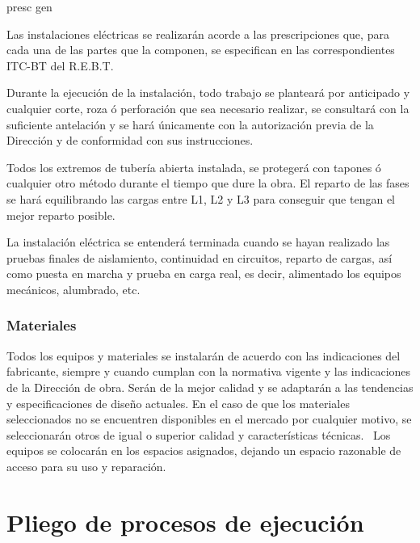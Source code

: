 presc gen


Las instalaciones eléctricas se realizarán acorde a las prescripciones que, para cada una de las partes que la componen, se especifican en las correspondientes ITC-BT del R.E.B.T.


Durante la ejecución de la instalación, todo trabajo se planteará por anticipado y cualquier corte, roza ó perforación que sea necesario realizar, se consultará con la suficiente antelación y se hará únicamente con la autorización previa de la Dirección y de conformidad con sus instrucciones. 


Todos los extremos de tubería abierta instalada, se protegerá con tapones ó cualquier otro método durante el tiempo que dure la obra.
El reparto de las fases se hará equilibrando las cargas entre L1, L2 y L3 para conseguir que tengan el mejor reparto posible.

La instalación eléctrica se entenderá terminada cuando se hayan realizado las pruebas finales de aislamiento, continuidad en circuitos, reparto de cargas, así como puesta en marcha y prueba en carga real, es decir, alimentado los equipos mecánicos, alumbrado, etc.




\subsubsection{Materiales}

Todos los equipos y materiales se instalarán de acuerdo con las indicaciones del fabricante, siempre y cuando cumplan con la normativa vigente y las indicaciones de la Dirección de obra. Serán de la mejor calidad y se adaptarán a las tendencias y especificaciones de diseño actuales. En el caso de que los materiales seleccionados no se encuentren disponibles en el mercado por cualquier motivo, se seleccionarán otros de igual o superior calidad y características técnicas. \
Los equipos se colocarán en los espacios asignados, dejando un espacio razonable de acceso para su uso y reparación.












\newpage

\section {Pliego de procesos de ejecución}

